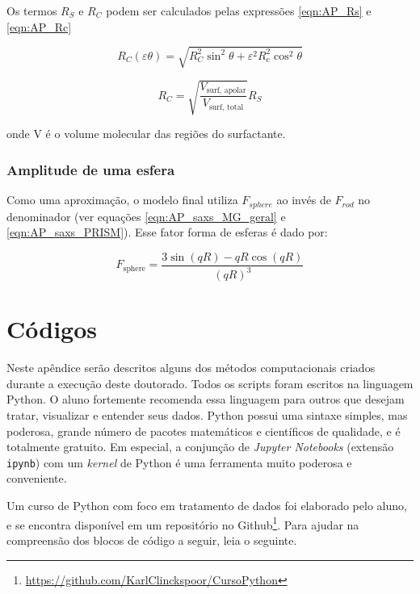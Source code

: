 \begin{apendicesenv}
Os termos \(R_S\) e \(R_C\) podem ser calculados pelas expressões \ref{eqn:AP_Rs} e \ref{eqn:AP_Rc}

\begin{equation}
R_C(\varepsilon\theta) = \sqrt{R_C^2\sin^2\theta + \varepsilon^2R_c^2\cos^2\theta}
\label{eqn:AP_Rc}
\end{equation}

\begin{equation}
R_C = \sqrt{\frac{V_{\textrm{surf, apolar}}}{V_{\textrm{surf, total}}}}R_S
\label{eqn:AP_Rs}
\end{equation}

\noindent onde V é o volume molecular das regiões do surfactante.

\subsection{Amplitude de uma esfera}
Como uma aproximação, o modelo final utiliza \(F_{sphere}\) ao invés de \(F_{rod}\) no denominador (ver equações \ref{eqn:AP_saxs_MG_geral} e \ref{eqn:AP_saxs_PRISM}). Esse fator forma de esferas é dado por:

\begin{equation}
	F_{\textrm{sphere}} = \dfrac{3\sin(qR) - qR\cos(qR)}{(qR)^3}
	\label{eqn:AP_Fsphere}
\end{equation}

\chapter{Códigos}

	Neste apêndice serão descritos alguns dos métodos computacionais criados durante a execução deste doutorado. Todos os scripts foram escritos na linguagem Python. O aluno fortemente recomenda essa linguagem para outros que desejam tratar, visualizar e entender seus dados. Python possui uma sintaxe simples, mas poderosa, grande número de pacotes matemáticos e científicos de qualidade, e é totalmente gratuito. Em especial, a conjunção de \emph{Jupyter Notebooks} (extensão \texttt{ipynb}) com um \emph{kernel} de Python é uma ferramenta muito poderosa e conveniente.
	
	Um curso de Python com foco em tratamento de dados foi elaborado pelo aluno, e se encontra disponível em um repositório no Github\footnote{\href{https://github.com/KarlClinckspoor/CursoPython}{https://github.com/KarlClinckspoor/CursoPython}}. Para ajudar na compreensão dos blocos de código a seguir, leia o seguinte.
	

\end{apendicesenv}
